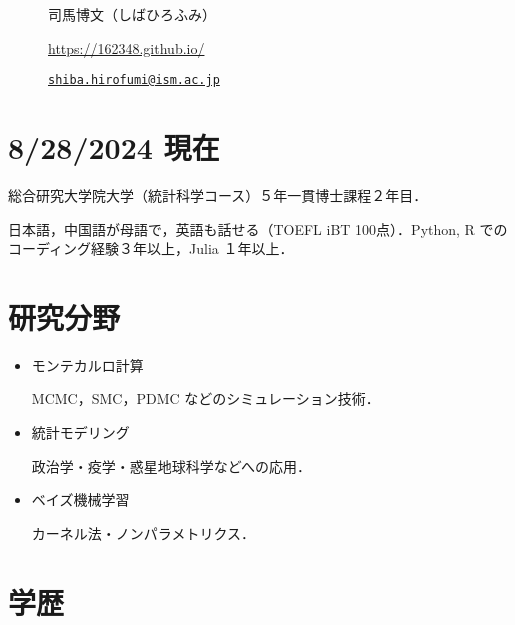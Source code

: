 \documentclass[
  11pt,
]{article}
\author{}
\date{}
\begin{document}
\begin{figure}

\begin{minipage}{0.50\linewidth}

\Huge 司馬博文（しばひろふみ）

\end{minipage}%
%
\begin{minipage}{0.50\linewidth}

\color{minty}

\hfill {} \url{https://162348.github.io/}

\par

\hfill {}
\href{mailto:shiba.hirofumi@ism.ac.jp}{\nolinkurl{shiba.hirofumi@ism.ac.jp}}

\par

\end{minipage}%

\end{figure}%

\vspace{-1em}

\section{8/28/2024 現在}\label{ux73feux5728}

総合研究大学院大学（統計科学コース）５年一貫博士課程２年目．

日本語，中国語が母語で，英語も話せる（TOEFL iBT 100点）．Python, R
でのコーディング経験３年以上，Julia １年以上．

\section{研究分野}\label{ux7814ux7a76ux5206ux91ce}

\begin{itemize}
\item
  モンテカルロ計算

  MCMC，SMC，PDMC などのシミュレーション技術．
\item
  統計モデリング

  政治学・疫学・惑星地球科学などへの応用．
\item
  ベイズ機械学習

  カーネル法・ノンパラメトリクス．
\end{itemize}

\section{学歴}\label{ux5b66ux6b74}
\end{document}
